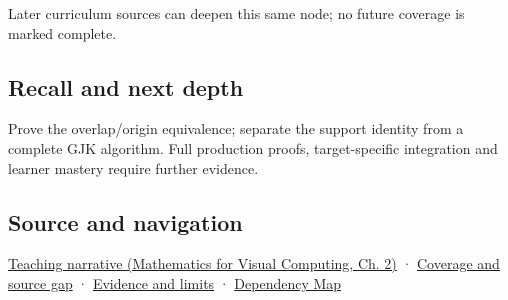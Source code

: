 Later curriculum sources can deepen this same node; no future coverage is marked complete.

\subsection{Recall and next depth}\label{appendix-215ac7099a82-recall-and-next-depth}

Prove the overlap/origin equivalence; separate the support identity from a complete GJK algorithm. Full production proofs, target-specific integration and learner mastery require further evidence.

\subsection{Source and navigation}\label{appendix-215ac7099a82-source-and-navigation}

\href{../02-Mathematics-for-Visual-Computing/main.pdf\#nameddest=01-foundations-i-ch018-weighted-points-lead-from-affine-geometry-to-collision-shapes}{Teaching narrative (Mathematics for Visual Computing, Ch. 2)} · \hyperref[appendix-fd090d982a15-phase-6---parts-501-600]{Coverage and source gap} · \hyperref[appendix-a103e7846d21-phase-6---source-analysis-and-verification]{Evidence and limits} · \hyperref[appendix-4ad47bdd269a]{Dependency Map}
